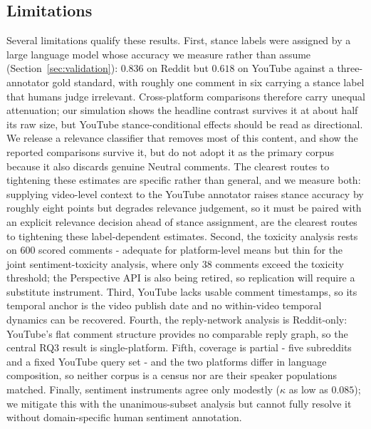 \documentclass[pdflatex,sn-basic,Numbered,iicol]{sn-jnl}
\begin{document}
\subsection{Limitations}
Several limitations qualify these results. First, stance labels were assigned by a
large language model whose accuracy we measure rather than assume
(Section~\ref{sec:validation}): $0.836$ on Reddit but $0.618$ on YouTube against a
three-annotator gold standard, with roughly one comment in six carrying a stance label
that humans judge irrelevant. Cross-platform comparisons therefore carry unequal
attenuation; our simulation shows the headline contrast survives it at about half its
raw size, but YouTube stance-conditional effects should be read as directional.
We release a relevance classifier that removes most of this content, and show the reported comparisons survive it, but do not adopt it as the primary corpus because it also discards genuine Neutral comments. The clearest routes to tightening these estimates are specific rather than general, and we measure both: supplying video-level context to the YouTube annotator raises stance accuracy by roughly eight points but degrades relevance judgement, so it must be paired with an explicit relevance decision ahead of
stance assignment, are the clearest routes to tightening these
label-dependent estimates. Second, the toxicity
analysis rests on 600 scored comments - adequate for platform-level means but thin
for the joint sentiment-toxicity analysis, where only 38 comments exceed the
toxicity threshold; the Perspective API is also being retired, so replication will
require a substitute instrument. Third, YouTube lacks usable comment timestamps, so
its temporal anchor is the video publish date and no within-video temporal dynamics
can be recovered. Fourth, the reply-network analysis is Reddit-only: YouTube's flat
comment structure provides no comparable reply graph, so the central RQ3 result is
single-platform. Fifth, coverage is partial - five subreddits and a fixed YouTube
query set - and the two platforms differ in language composition, so neither corpus is
a census nor are their speaker populations matched. Finally, sentiment instruments
agree only modestly ($\kappa$ as low as $0.085$); we mitigate this with the
unanimous-subset analysis but cannot fully resolve it without domain-specific human
sentiment annotation.
\end{document}
